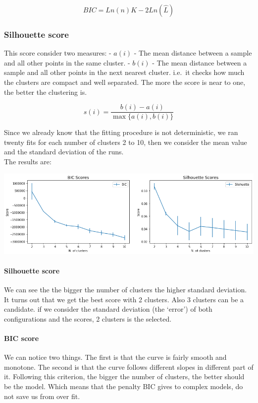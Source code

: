 \documentclass[20pt,a4paper]{article}
\begin{document}
$$BIC= Ln(n)K - 2Ln(\hat L)$$

\subsubsection{Silhouette score}
This score consider two measures: - \(a(i)\) - The mean distance between
a sample and all other points in the same cluster. - \(b(i)\) - The mean
distance between a sample and all other points in the next nearest
cluster.
i.e.~it checks how much the clusters are compact and well separated. The
more the score is near to one, the better the clustering is.

$$s(i) = \frac{b(i) - a(i)}{\max\{a(i), b(i)\}}$$

Since we already know that the fitting procedure is not deterministic,
we ran twenty fits for each number of clusters 2 to 10, then we consider
the mean value and the standard deviation of the runs.\\
The results are:

\begin{center}
\includegraphics[scale=0.45]{graphs/output_39_0.png}
\end{center}
    
    
\paragraph{Silhouette score}
We can see the the bigger the number of clusters the higher standard
deviation. It turns out that we get the best score with 2 clusters. Also
3 clusters can be a candidate. if we consider the standard deviation
(the `error') of both configurations and the scores, 2 clusters is the
selected.

\paragraph{BIC score}
We can notice two things. The first is that the curve is fairly smooth
and monotone. The second is that the curve follows different slopes in
different part of it. Following this criterion, the bigger the number of
clusters, the better should be the model. Which means that the penalty
BIC gives to complex models, do not save us from over fit.
\end{document}
